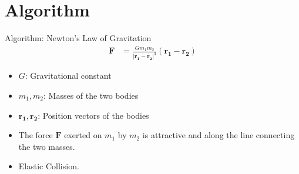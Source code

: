 \documentclass[10pt, xcolor = svgnames, aspectratio=43]{beamer} %
\begin{document}
\section{Algorithm}


\begin{frame}{Algorithm: Newton's Law of Gravitation}
\begin{align}
	\mathbf{F}
	& = \frac{G m_1 m_2}{\left| \mathbf{r_1} - \mathbf{r_2} \right|^3} (\mathbf{r_1} - \mathbf{r_2})
\end{align}
\begin{itemize}
    \item $G$: Gravitational constant
    \item $m_1, m_2$: Masses of the two bodies
    \item $\mathbf{r_1}, \mathbf{r_2}$: Position vectors of the bodies
    \item The force $\mathbf{F}$ exerted on $m_1$ by $m_2$ is attractive and along the line connecting the two masses.
    \item Elastic Collision.
\end{itemize}
\end{frame}
\end{document}
